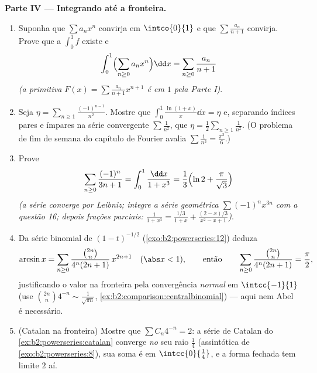 \begin{problem}
\medskip
\noindent\textbf{Parte IV --- Integrando até a fronteira.}
\begin{enumerate}[resume]
  \item Suponha que $\sum a_nx^n$ convirja em $\intco{0}{1}$ e que
        $\sum \frac{a_n}{n+1}$ convirja. Prove que a
         $\int_0^1 f$ existe e
        \[
        \int_0^1 \Bigl(\sum_{n\geq0} a_nx^n\Bigr)\dd x
        = \sum_{n\geq0}\frac{a_n}{n+1}
        \]
        \emph{(a primitiva $F(x) = \sum\frac{a_n}{n+1}x^{n+1}$
        é  em $1$ pela Parte I)}.
  \item Seja $\eta = \sum_{n\geq1}\frac{(-1)^{n-1}}{n^2}$. Mostre que
        $\int_0^1 \frac{\ln(1+x)}{x}\dd x = \eta$ e, separando índices pares e ímpares na
        série  convergente $\sum \frac1{n^2}$, que $\eta =
        \frac12\sum_{n\geq1}\frac{1}{n^2}$. (O problema de fim de semana do
        capítulo de Fourier avalia
        $\sum\frac1{n^2} = \frac{\pi^2}{6}$.)
  \item Prove
        \[
        \sum_{n\geq0}\frac{(-1)^n}{3n+1}
        = \int_0^1\frac{\dd x}{1+x^3}
        = \frac13\Bigl(\ln 2 + \frac{\pi}{\sqrt3}\Bigr)
        \]
        \emph{(a série converge por Leibniz; integre a
        série geométrica $\sum(-1)^nx^{3n}$ com a questão 16;
        depois frações parciais: $\frac{1}{1+x^3} =
        \frac{1/3}{1+x} + \frac{(2-x)/3}{x^2-x+1}$)}.
  \item Da série binomial de $(1-t)^{-1/2}$
        (\cref{exo:b2:powerseries:12}) deduza
        \[
        \arcsin x = \sum_{n\geq0}
        \frac{\binom{2n}{n}}{4^n(2n+1)}\,x^{2n+1}
        \quad(\abs x < 1),
        \qquad\text{então}\qquad
        \sum_{n\geq0}\frac{\binom{2n}{n}}{4^n(2n+1)}
        = \frac\pi2 ,
        \]
        justificando o valor na fronteira pela convergência
        \emph{normal} em $\intcc{-1}{1}$ (use
        $\binom{2n}n4^{-n} \sim \frac{1}{\sqrt{\pi n}}$,
        \cref{ex:b2:comparison:centralbinomial}) --- aqui nem
        Abel é necessário.
  \item (Catalan na fronteira) Mostre que $\sum C_n 4^{-n} =
        2$: a série de Catalan do
        \cref{ex:b2:powerseries:catalan} converge \emph{no}
        seu raio $\frac14$ (assintótica de
        \cref{exo:b2:powerseries:8}), sua soma é  em
        $\intcc{0}{\frac14}$, e a forma fechada tem limite $2$
        aí.
\end{enumerate}


\end{problem}
